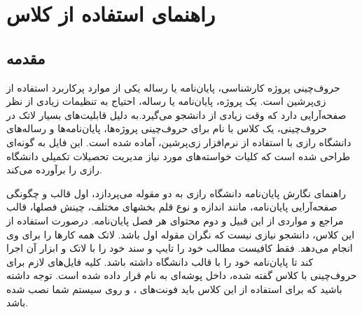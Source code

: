 
\chapter{راهنمای استفاده از کلاس}
\thispagestyle{empty}
\section{مقدمه}
حروف‌چینی پروژه کارشناسی، پایان‌نامه یا رساله یکی از موارد پرکاربرد استفاده از زی‌پرشین \cite{Khalighi87xepersian} است.  یک پروژه، پایان‌نامه یا رساله،  احتیاج به تنظیمات زیادی از نظر صفحه‌آرایی  دارد که وقت زیادی از دانشجو می‌گیرد.به دلیل قابلیت‌های بسیار لاتک در حروف‌چینی، یک کلاس با نام 
 برای حروف‌چینی پروژه‌ها، پایان‌نامه‌ها و رساله‌های دانشگاه  رازی با استفاده از نرم‌افزار زی‌پرشین،  آماده شده است. این فایل به 
گونه‌ای طراحی شده است که کلیات خواسته‌های مورد نیاز  مدیریت تحصیلات تکمیلی دانشگاه  رازی \cite{ThesisGuide} را برآورده می‌کند.%

راهنمای نگارش پایان‌نامه دانشگاه  رازی به دو مقوله می‌پردازد، اول قالب و چگونگی صفحه‌آرایی پایان‌نامه، مانند اندازه و نوع قلم بخشهای مختلف، چینش فصلها، قالب مراجع و مواردی از این قبیل و دوم محتوای هر فصل پایان‌نامه. 
درصورت استفاده از این کلاس، دانشجو  نیازی نیست که نگران مقوله اول باشد. لاتک همه کارها را برای وی انجام می‌دهد. فقط کافیست مطالب خود را تایپ و سند خود را با لاتک و ابزار آن اجرا کند تا پایان‌نامه خود را با قالب دانشگاه داشته باشد.
کلیه فایل‌های لازم برای حروف‌چینی با کلاس گفته شده، داخل پوشه‌ای به نام
  قرار داده شده است. توجه داشته باشید که برای استفاده از این کلاس باید فونت‌های
  ،
 و
    روی سیستم شما نصب شده باشد.
